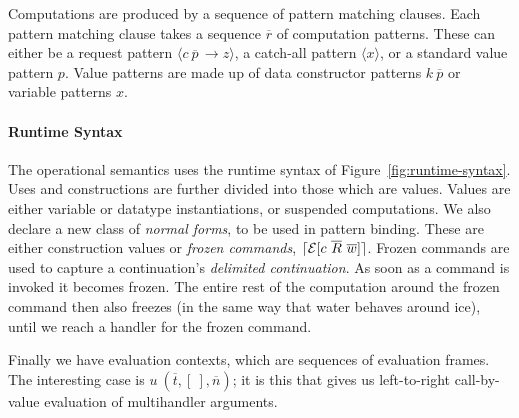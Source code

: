 \documentclass[msc,deptreport,cs]{infthesis} %
\DeclarePairedDelimiter{\ceil}{\lceil}{\rceil}
\newcommand{\many}{\overline}
\newcommand{\handleSymbol}{\rightarrow}
\newcommand{\handle}[2]{{#1} \handleSymbol {#2}}
\newcommand{\effin}[1]{\langle {#1} \rangle}
\newcommand{\EC}{\mathcal{E}}
\newcommand{\freeze}{\ceil}
\begin{document}
Computations are produced by a sequence of pattern matching clauses. Each
pattern matching clause takes a sequence $\many{r}$ of computation patterns.
These can either be a request pattern $\effin{\handle{c~\many{p}\,}{z}}$, a
catch-all pattern $\effin{x}$, or a standard value pattern $p$. Value patterns
are made up of data constructor patterns $k~\many{p}$ or variable patterns $x$.

\paragraph*{Runtime Syntax}

The operational semantics uses the runtime syntax of
Figure~\ref{fig:runtime-syntax}.
%
Uses and constructions are further divided into those which are values. Values
are either variable or datatype instantiations, or suspended computations.
%
We also declare a new class of \emph{normal forms}, to be used in pattern
binding. These are either construction values or \emph{frozen commands},
$\freeze{\EC[c~\many{R}~\many{w}]}$.
%
Frozen commands are used to capture a continuation's \emph{delimited
  continuation}. As soon as a command is invoked it becomes frozen. The entire
rest of the computation around the frozen command then also freezes (in the same
way that water behaves around ice), until we reach a handler for the frozen
command.

Finally we have evaluation contexts, which are sequences of evaluation frames.
The interesting case is $u~(\many{t}, [~],\many{n})$; it is this that gives us
left-to-right call-by-value evaluation of multihandler arguments.
\end{document}

